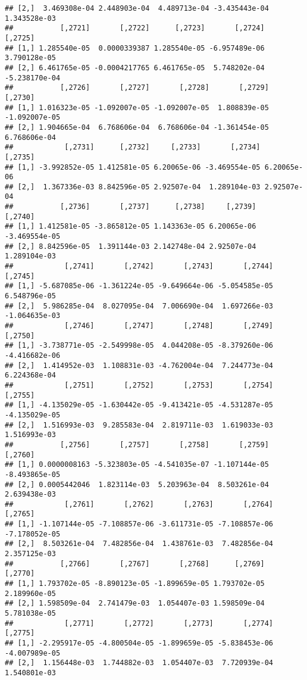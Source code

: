 \documentclass[
]{article}
\begin{document}
\begin{verbatim}
## [2,]  3.469308e-04 2.448903e-04  4.489713e-04 -3.435443e-04  1.343528e-03
##           [,2721]       [,2722]      [,2723]       [,2724]       [,2725]
## [1,] 1.285540e-05  0.0000339387 1.285540e-05 -6.957489e-06  3.790128e-05
## [2,] 6.461765e-05 -0.0004217765 6.461765e-05  5.748202e-04 -5.238170e-04
##           [,2726]       [,2727]       [,2728]       [,2729]       [,2730]
## [1,] 1.016323e-05 -1.092007e-05 -1.092007e-05  1.808839e-05 -1.092007e-05
## [2,] 1.904665e-04  6.768606e-04  6.768606e-04 -1.361454e-05  6.768606e-04
##            [,2731]      [,2732]     [,2733]       [,2734]     [,2735]
## [1,] -3.992852e-05 1.412581e-05 6.20065e-06 -3.469554e-05 6.20065e-06
## [2,]  1.367336e-03 8.842596e-05 2.92507e-04  1.289104e-03 2.92507e-04
##           [,2736]       [,2737]      [,2738]     [,2739]       [,2740]
## [1,] 1.412581e-05 -3.865812e-05 1.143363e-05 6.20065e-06 -3.469554e-05
## [2,] 8.842596e-05  1.391144e-03 2.142748e-04 2.92507e-04  1.289104e-03
##            [,2741]       [,2742]       [,2743]       [,2744]       [,2745]
## [1,] -5.687085e-06 -1.361224e-05 -9.649664e-06 -5.054585e-05  6.548796e-05
## [2,]  5.986285e-04  8.027095e-04  7.006690e-04  1.697266e-03 -1.064635e-03
##            [,2746]       [,2747]       [,2748]       [,2749]       [,2750]
## [1,] -3.738771e-05 -2.549998e-05  4.044208e-05 -8.379260e-06 -4.416682e-06
## [2,]  1.414952e-03  1.108831e-03 -4.762004e-04  7.244773e-04  6.224368e-04
##            [,2751]       [,2752]       [,2753]       [,2754]       [,2755]
## [1,] -4.135029e-05 -1.630442e-05 -9.413421e-05 -4.531287e-05 -4.135029e-05
## [2,]  1.516993e-03  9.285583e-04  2.819711e-03  1.619033e-03  1.516993e-03
##           [,2756]       [,2757]       [,2758]       [,2759]       [,2760]
## [1,] 0.0000008163 -5.323803e-05 -4.541035e-07 -1.107144e-05 -8.493865e-05
## [2,] 0.0005442046  1.823114e-03  5.203963e-04  8.503261e-04  2.639438e-03
##            [,2761]       [,2762]       [,2763]       [,2764]       [,2765]
## [1,] -1.107144e-05 -7.108857e-06 -3.611731e-05 -7.108857e-06 -7.178052e-05
## [2,]  8.503261e-04  7.482856e-04  1.438761e-03  7.482856e-04  2.357125e-03
##           [,2766]       [,2767]       [,2768]      [,2769]      [,2770]
## [1,] 1.793702e-05 -8.890123e-05 -1.899659e-05 1.793702e-05 2.189960e-05
## [2,] 1.598509e-04  2.741479e-03  1.054407e-03 1.598509e-04 5.781038e-05
##            [,2771]       [,2772]       [,2773]       [,2774]       [,2775]
## [1,] -2.295917e-05 -4.800504e-05 -1.899659e-05 -5.838453e-06 -4.007989e-05
## [2,]  1.156448e-03  1.744882e-03  1.054407e-03  7.720939e-04  1.540801e-03

\end{verbatim}
\end{document}
